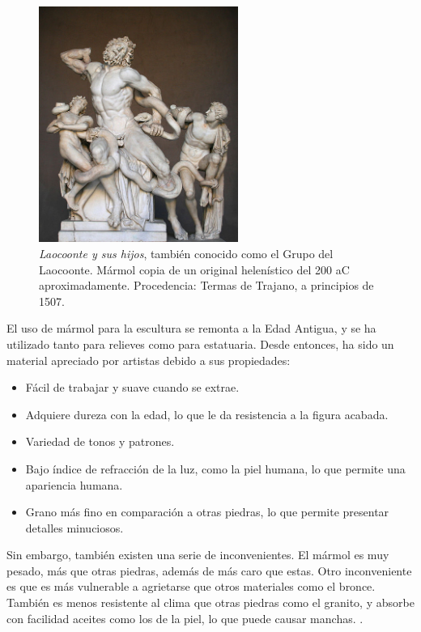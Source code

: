 \begin{figure}[H]
	\centering
	\includegraphics[width=6.5cm]{imagenes/laocoonte_escultura}
	\caption{\textit{Laocoonte y sus hijos}, también conocido como el Grupo del Laocoonte. Mármol copia de un original helenístico del 200 aC aproximadamente. Procedencia: Termas de Trajano, a principios de 1507.}
	\label{fig:laocoonte_escultura}
\end{figure}

El uso de mármol para la escultura se remonta a la Edad Antigua, y se ha utilizado tanto para relieves como para estatuaria. Desde entonces, ha sido un material apreciado por artistas debido a sus propiedades:

\begin{itemize}
	\item Fácil de trabajar y suave cuando se extrae.
	\item Adquiere dureza con la edad, lo que le da resistencia a la figura acabada.
	\item Variedad de tonos y patrones.
	\item Bajo índice de refracción de la luz, como la piel humana, lo que permite una apariencia humana.
	\item Grano más fino en comparación a otras piedras, lo que permite presentar detalles minuciosos.
\end{itemize}

Sin embargo, también existen una serie de inconvenientes. El mármol es muy pesado, más que otras piedras, además de más caro que estas. Otro inconveniente es que es más vulnerable a agrietarse que otros materiales como el bronce. También es menos resistente al clima que otras piedras como el granito, y absorbe con facilidad aceites como los de la piel, lo que puede causar manchas. \cite{sculpture_introduction}.

